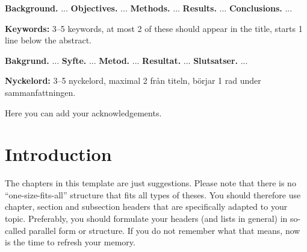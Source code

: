 \documentclass[a4paper,twoside]{bth}
\begin{document}
\abstract
\noindent
\textbf{Background.} ... \newline
\textbf{Objectives.} ... \newline
\textbf{Methods.} ... \newline
\textbf{Results.} ... \newline
\textbf{Conclusions.} ...

\vspace{1cm}
\noindent
\textbf{Keywords:} 3--5 keywords, at most 2 of these should appear in the title, starts 1 line
below the abstract.

\cleardoublepage


\sammanfattning
{}
\noindent
\textbf{Bakgrund.} ... \newline
\textbf{Syfte.} ... \newline
\textbf{Metod.} ... \newline
\textbf{Resultat.} ... \newline
\textbf{Slutsatser.} ...

\vspace{1cm}
\noindent
\textbf{Nyckelord:} 3--5 nyckelord, maximal 2 från titeln, börjar 1 rad under sammanfattningen.

\cleardoublepage


\acknowledgments %
\noindent
Here you can add your acknowledgements.

\cleardoublepage


\tableofcontents

\cleardoublepage
\pagestyle{headings}



\chapter{Introduction}
\label{sec:introduction}  %
The chapters in this template are just suggestions.
Please note that there is no ``one-size-fits-all'' structure that fits all types of theses.
You should therefore use chapter, section and subsection headers that are specifically
adapted to your topic. Preferably, you should formulate your headers (and lists in general)
in so-called parallel form or structure.
If you do not remember what that means, now is the time to refresh your memory.
\end{document}
